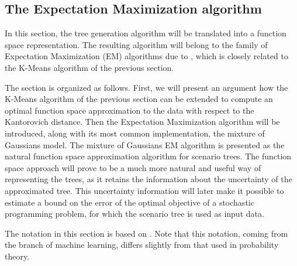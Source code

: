 \subsection{The Expectation Maximization algorithm}
\label{sec:k-means-as-EM}
In this section, the tree generation algorithm will be translated into a function space representation.
The resulting algorithm will belong to the family of Expectation Maximization (EM) algorithms due to \citet{Dempster1977}, which is closely related to the K-Means algorithm of the previous section.

The section is organized as follows.
First, we will present an argument how the K-Means algorithm of the previous section can be extended to compute an optimal function space approximation to the data with respect to the Kantorovich distance.
Then the Expectation Maximization algorithm will be introduced, along with its most common implementation, the mixture of Gaussians model.
The mixture of Gaussians EM algorithm is presented as the natural function space approximation algorithm for scenario trees.
The function space approach will prove to be a much more natural and useful way of representing the trees, as it retains the information about the uncertainty of the approximated tree.
This uncertainty information will later make it possible to estimate a bound on the error of the optimal objective of a stochastic programming problem, for which the scenario tree is used as input data.

The notation in this section is based on \citet{Bishop2006}.
Note that this notation, coming from the branch of machine learning, differs slightly from that used in probability theory.
